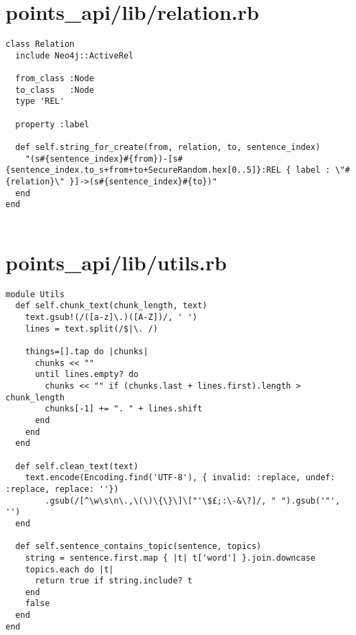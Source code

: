 \documentclass{article}
\begin{document}
\section*{points\_api/lib/relation.rb}
\begin{verbatim}
class Relation
  include Neo4j::ActiveRel

  from_class :Node
  to_class   :Node
  type 'REL'

  property :label

  def self.string_for_create(from, relation, to, sentence_index)
    "(s#{sentence_index}#{from})-[s#{sentence_index.to_s+from+to+SecureRandom.hex[0..5]}:REL { label : \"#{relation}\" }]->(s#{sentence_index}#{to})"
  end
end


\end{verbatim}
\pagebreak

\section*{points\_api/lib/utils.rb}
\begin{verbatim}
module Utils
  def self.chunk_text(chunk_length, text)
    text.gsub!(/([a-z]\.)([A-Z])/, ' ')
    lines = text.split(/$|\. /)

    things=[].tap do |chunks|
      chunks << ""
      until lines.empty? do
        chunks << "" if (chunks.last + lines.first).length > chunk_length
        chunks[-1] += ". " + lines.shift
      end
    end
  end

  def self.clean_text(text)
    text.encode(Encoding.find('UTF-8'), { invalid: :replace, undef: :replace, replace: ''})
        .gsub(/[^\w\s\n\.,\(\)\{\}\]\["'\$£;:\-&\?]/, " ").gsub('"', '')
  end

  def self.sentence_contains_topic(sentence, topics)
    string = sentence.first.map { |t| t['word'] }.join.downcase
    topics.each do |t|
      return true if string.include? t
    end
    false
  end
end


\end{verbatim}
\pagebreak
\end{document}

